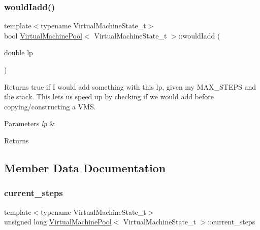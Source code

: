 \subsubsection{\texorpdfstring{would\+Iadd()}{wouldIadd()}}
{\footnotesize\ttfamily template$<$typename Virtual\+Machine\+State\+\_\+t$>$ \\
bool \hyperlink{class_virtual_machine_pool}{Virtual\+Machine\+Pool}$<$ Virtual\+Machine\+State\+\_\+t $>$\+::would\+Iadd (\begin{DoxyParamCaption}\item[{double}]{lp }\end{DoxyParamCaption})\hspace{0.3cm}{\ttfamily [inline]}}



Returns true if I would add something with this lp, given my M\+A\+X\+\_\+\+S\+T\+E\+PS and the stack. This lets us speed up by checking if we would add before copying/constructing a V\+MS. 


\begin{DoxyParams}{Parameters}
{\em lp} & \\
\hline
\end{DoxyParams}
\begin{DoxyReturn}{Returns}

\end{DoxyReturn}


\subsection{Member Data Documentation}
\mbox{\label{class_virtual_machine_pool_aac7defa672fe880ecb6e47ba0c22e5d3}} 
\subsubsection{\texorpdfstring{current\+\_\+steps}{current\_steps}}
{\footnotesize\ttfamily template$<$typename Virtual\+Machine\+State\+\_\+t$>$ \\
unsigned long \hyperlink{class_virtual_machine_pool}{Virtual\+Machine\+Pool}$<$ Virtual\+Machine\+State\+\_\+t $>$\+::current\+\_\+steps}

\mbox{\label{class_virtual_machine_pool_a9c8823331ead214c736dacb390a672a8}} 
